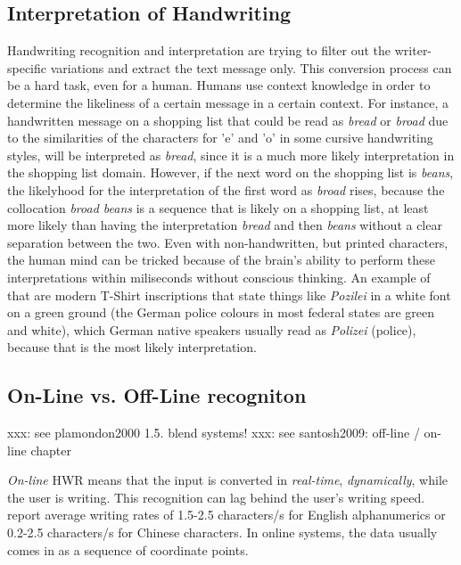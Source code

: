 \subsection{Interpretation of Handwriting}
\label{sec:interpretationofhandwriting}

Handwriting recognition and interpretation are trying to filter out the 
writer-specific variations and extract the text message only. This conversion
process can be a hard task, even for a human. Humans use context knowledge
in order to determine the likeliness of a certain message in a certain context.
For instance, a handwritten message on a shopping list that could be read
as \emph{bread} or \emph{broad} due to the similarities of the characters 
for 'e' and 'o' in some cursive handwriting styles, will be interpreted 
as \emph{bread}, since it is a much more likely interpretation in the 
shopping list domain. However, if the next word on the shopping list 
is \emph{beans}, the likelyhood for the interpretation of the first word
as \emph{broad} rises, because the collocation \emph{broad beans} is a
sequence that is likely on a shopping list, at least more likely than
having the interpretation \emph{bread} and then \emph{beans} without a
clear separation between the two. Even with non-handwritten, 
but printed characters, the human mind can be tricked because of the 
brain's ability to perform these interpretations within miliseconds 
without conscious thinking. An example of that are modern T-Shirt inscriptions
that state things like \emph{Pozilei} in a white font on a green ground 
(the German police colours in most federal states are green and white), 
which German native speakers usually read as \emph{Polizei} (police),
because that is the most likely interpretation.

\subsection{On-Line vs. Off-Line recogniton}
\label{sec:onlinevsoffline}

xxx: see plamondon2000 1.5. blend systems!
xxx: see santosh2009: off-line / on-line chapter

\emph{On-line} HWR means that the input is converted in \emph{real-time}, 
\emph{dynamically}, while the user is writing. This recognition can lag behind
the user's writing speed.  report average writing rates 
of 1.5-2.5 characters/s for English alphanumerics or 0.2-2.5 characters/s for 
Chinese characters. In online systems, the data usually comes in as a sequence 
of coordinate points.

